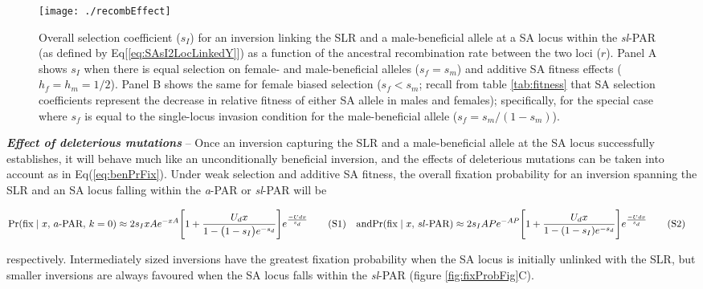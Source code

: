 \documentclass[11pt]{article}
\newcommand\numberthis{\addtocounter{equation}{1}\tag{\theequation}}
\begin{document}
 \begin{figure}[!htbp]
 \centering
 \texttt{[image: ./recombEffect]}
 \caption{Overall selection coefficient ($s_I$) for an inversion linking the SLR and a male-beneficial allele at a SA locus within the {\itshape sl}-PAR (as defined by Eq[\ref{eq:SAsI2LocLinkedY}]) as a function of the ancestral recombination rate between the two loci ($r$). Panel A shows $s_I$ when there is equal selection on female- and male-beneficial alleles ($s_f = s_m$) and additive SA fitness effects ($h_f = h_m = 1/2$). Panel B shows the same for female biased selection ($s_f < s_m$; recall from table \ref{tab:fitness} that SA selection coefficients represent the decrease in relative fitness of either SA allele in males and females); specifically, for the special case where $s_f$ is equal to the single-locus invasion condition for the male-beneficial allele ($s_f = s_m / (1 - s_m)$).}
 \label{fig:recombEffect}
 \end{figure}


{\bf \itshape Effect of deleterious mutations} -- Once an inversion capturing the SLR and a male-beneficial allele at the SA locus successfully establishes, it will behave much like an unconditionally beneficial inversion, and the effects of deleterious mutations can be taken into account as in Eq(\ref{eq:benPrFix}). Under weak selection and additive SA fitness, the overall fixation probability for an inversion spanning the SLR and an SA locus falling within the {\itshape a}-PAR or {\itshape sl}-PAR will be 


\begin{subequations}\label{eq:SAPfixWithDel}
	\begin{align*}
	\Pr (\text{fix} \mid x,\,a\text{-PAR},\, k=0) &\approx 2 s_I x A e^{-xA} \Bigg[1 + \frac{U_d x}{1 - \big(1 - s_I \big) e^{-s_d}} \Bigg]e^{\frac{-Ud x}{s_d}} \numberthis
	\end{align*}
	\text{and}
	\begin{align*}
	\Pr (\text{fix} \mid x,\,sl\text{-PAR}) &\approx 2 s_I A P e^{-A P} \Bigg[1 + \frac{U_d x}{1 - (1 - s_I) e^{-s_d}} \Bigg]e^{\frac{-Ud x}{s_d}} \numberthis
	\end{align*}
\end{subequations}

\noindent respectively. Intermediately sized inversions have the greatest fixation probability when the SA locus is initially unlinked with the SLR, but smaller inversions are always favoured when the SA locus falls within the {\itshape sl}-PAR (figure \ref{fig:fixProbFig}C). \vspace{12pt}
\end{document}
